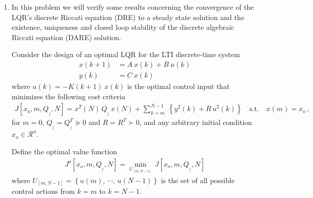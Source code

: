 \documentclass[letterpaper,12pt]{article}
\begin{document}
\begin{enumerate}



\item
In this problem we will verify some results concerning the convergence of the LQR's discrete Riccati equation (DRE) to a steady state solution and the existence, uniqueness and closed loop stability of the discrete algebraic Riccati equation (DARE) solution.


Consider the design of an optimal LQR for the LTI discrete-time system
\begin{align}
    \label{abc1}
    x(k+1) & = A \: x(k) + B \: u(k) \\
    y(k) & = C \: x(k) \, \nonumber
\end{align}
where $u(k) = -K(k+1) \: x(k)$ is the optimal control input that minimizes the following cost criteria
\begin{align*}
    J[x_o, m, Q_{_f},N] = x^T(N)\, Q_{_f} \, x(N) + \sum_{k=m}^{N-1} \: \left \{ y^2(k) + R\,u^2(k) \right \}
        \quad \textrm{s.t.} \quad x(m) = x_o\,,
\end{align*}
for $m = 0$, $Q_{_f} = Q_{_f}^T \succeq 0$ and $R = R^T \succ 0$, and any arbitrary initial condition $x_o \in \mathcal{R}^n$.

Define the optimal value function
\begin{align*}
    J^o[x_o, m, Q_{_f},N] = \min_{U_{[m,N-1]}} \, J[x_o, m, Q_{_f},N]
\end{align*}
where $U_{[m,N-1]} = \left \{ u(m),\, \cdots , \, u(N-1)\right \}$ is the set of all possible control actions from $k=m$ to $k=N-1$.

\begin{enumerate}


\end{enumerate}
\end{enumerate}
\end{document}
